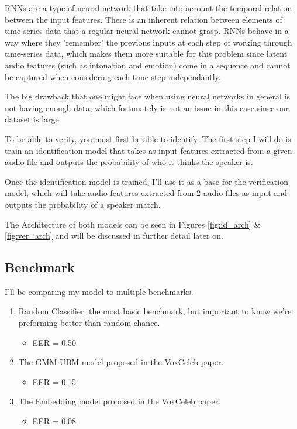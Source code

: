 \documentclass{article}
\begin{document}
RNNs are a type of neural network that take into account the temporal relation between the input features. There is an inherent relation between elements of time-series data that a regular neural network cannot grasp. RNNs behave in a way where they 'remember' the previous inputs at each step of working through time-series data, which makes them more suitable for this problem since latent audio features (such as intonation and emotion) come in a sequence and cannot be captured when considering each time-step independantly.

The big drawback that one might face when using neural networks in general is not having enough data, which fortunately is not an issue in this case since our dataset is large.

To be able to verify, you must first be able to identify. The first step I will do is train an identification model that takes as input features extracted from a given audio file and outputs the probability of who it thinks the speaker is.

Once the identification model is trained, I'll use it as a base for the verification model, which will take audio features extracted from 2 audio files as input and outputs the probability of a speaker match.

The Architecture of both models can be seen in Figures \ref{fig:id_arch} \& \ref{fig:ver_arch} and will be discussed in further detail later on.

\subsection{Benchmark}

I'll be comparing my model to multiple benchmarks.

\begin{enumerate}
    \item Random Classifier: the most basic benchmark, but important to know we're preforming better than random chance.
    \begin{itemize}
        \item EER = 0.50
    \end{itemize}
    \item The GMM-UBM model proposed in the VoxCeleb paper.
    \begin{itemize}
        \item EER = 0.15
    \end{itemize}    
    \item The Embedding model proposed in the VoxCeleb paper.
    \begin{itemize}
        \item EER = 0.08
    \end{itemize}
\end{enumerate}
\end{document}
